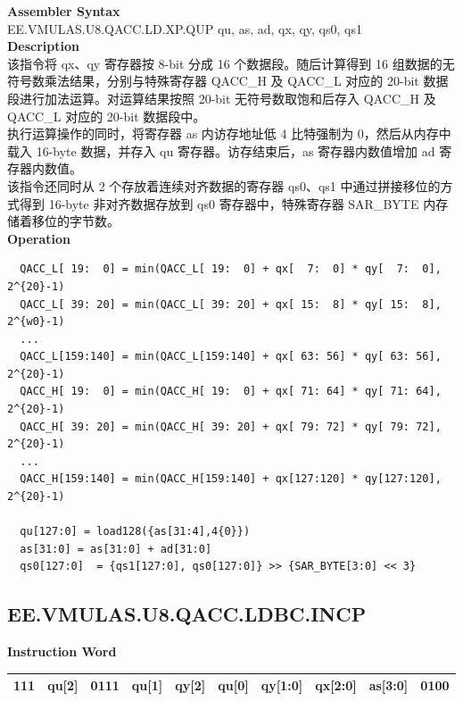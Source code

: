 \textbf{Assembler Syntax} \\
EE.VMULAS.U8.QACC.LD.XP.QUP qu, as, ad, qx, qy, qs0, qs1 \\
\textbf{Description} \\
该指令将 qx、qy 寄存器按 8-bit 分成 16 个数据段。随后计算得到 16 组数据的无符号数乘法结果，分别与特殊寄存器 QACC\_H 及 QACC\_L 对应的 20-bit 数据段进行加法运算。对运算结果按照 20-bit 无符号数取饱和后存入 QACC\_H 及 QACC\_L 对应的 20-bit 数据段中。\\
执行运算操作的同时，将寄存器 as 内访存地址低 4 比特强制为 0，然后从内存中载入 16-byte 数据，并存入 qu 寄存器。访存结束后，as 寄存器内数值增加 ad 寄存器内数值。\\
该指令还同时从 2 个存放着连续对齐数据的寄存器 qs0、qs1 中通过拼接移位的方式得到 16-byte 非对齐数据存放到 qs0 寄存器中，特殊寄存器 SAR\_BYTE 内存储着移位的字节数。\\
\textbf{Operation}
\begin{lstlisting}
  QACC_L[ 19:  0] = min(QACC_L[ 19:  0] + qx[  7:  0] * qy[  7:  0], 2^{20}-1)
  QACC_L[ 39: 20] = min(QACC_L[ 39: 20] + qx[ 15:  8] * qy[ 15:  8], 2^{w0}-1)
  ...
  QACC_L[159:140] = min(QACC_L[159:140] + qx[ 63: 56] * qy[ 63: 56], 2^{20}-1)
  QACC_H[ 19:  0] = min(QACC_H[ 19:  0] + qx[ 71: 64] * qy[ 71: 64], 2^{20}-1)
  QACC_H[ 39: 20] = min(QACC_H[ 39: 20] + qx[ 79: 72] * qy[ 79: 72], 2^{20}-1)
  ...
  QACC_H[159:140] = min(QACC_H[159:140] + qx[127:120] * qy[127:120], 2^{20}-1)

  qu[127:0] = load128({as[31:4],4{0}})
  as[31:0] = as[31:0] + ad[31:0]
  qs0[127:0]  = {qs1[127:0], qs0[127:0]} >> {SAR_BYTE[3:0] << 3}
\end{lstlisting}

\clearpage
\subsection{EE.VMULAS.U8.QACC.LDBC.INCP}\label{instruction:EEVMULASU8QACCLDBCINCP}
\setlength\tabcolsep{6pt}
\textbf{Instruction Word} \\
\begin{tabular}{|c|c|c|c|c|c|c|c|c|c|}
	\hline
	111 & qu[2] & 0111 & qu[1] & qy[2] & qu[0] & qy[1:0] & qx[2:0] & as[3:0] & 0100 \\
	\hline
\end{tabular}

